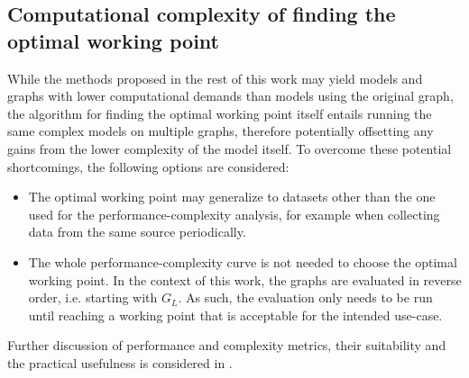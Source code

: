 \subsection{Computational complexity of finding the optimal working point}

While the methods proposed in the rest of this work may yield models and graphs with lower computational demands than models using the original graph, the algorithm for finding the optimal working point itself entails running the same complex models on multiple graphs, therefore potentially offsetting any gains from the lower complexity of the model itself. To overcome these potential shortcomings, the following options are considered:
\begin{itemize}
  \item The optimal working point may generalize to datasets other than the one used for the performance-complexity analysis, for example when collecting data from the same source periodically.
  \item The whole performance-complexity curve is not needed to choose the optimal working point. In the context of this work, the graphs are evaluated in reverse order, i.e. starting with \( G_L \). As such, the evaluation only needs to be run until reaching a working point that is acceptable for the intended use-case.
\end{itemize}
Further discussion of performance and complexity metrics, their suitability and the practical usefulness is considered in \cite{prochazka_downstream_2022}.
